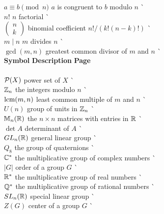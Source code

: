 \begin{tabbing}
$a \equiv b \pmod{n}$ \> $a$ is congruent to $b$ modulo $n$ \> 
     \` \pageref{amodb} \\
$n!$ \> $n$ factorial \> \` \pageref{factorial} \\
$\left(\begin{array}{c}n \\ k \end{array} \right)$ \> binomial
     coefficient $n!/(k! (n-k)!)$ \> \` \pageref{binomial} \\
$m \mid n$ \> $m$ divides $n$ \> \` \pageref{divides} \\
$\gcd(m, n)$ \> greatest common divisor of $m$ and $n$ \>
     \` \pageref{greatestcd} \\
{\bf Symbol}  \> {\bf Description} \>  \` {\bf Page} \\ 
     \mbox{\hspace*{1in}} \\
${\cal P}(X)$ \> power set of $X$ \> \` \pageref{powerset} \\
${\Bbb Z}_n$ \> the integers modulo $n$ \> \` \pageref{integersmodn} \\
$\operatorname{lcm}(m,n)$ \> least common multiple of $m$ and $n$ \>
     \` \pageref{leastcm} \\
$U(n)$ \> group of units in ${\Bbb Z}_n$ \> \` \pageref{groupofunits} \\
${\Bbb M}_n ( {\Bbb R})$ \> the $n \times n$ matrices with entries in
     ${\Bbb R}$ \> \`  \pageref{notematrices} \\
$\det A$ \> determinant of $A$ \> \` \pageref{determinant} \\
$GL_n({\Bbb R})$ \> general linear group \> \` \pageref{generallinear} \\
$Q_8$ \> the group of quaternions \> \` \pageref{notequateriongroup} \\
${\Bbb C}^\ast$ \> the multiplicative group of complex numbers \>
     \` \pageref{noteCstar} \\
$|G|$ \> order of a group $G$ \> \` \pageref{noteorder} \\
${\Bbb R}^*$ \> the multiplicative group of real numbers \>
     \` \pageref{noteRstar} \\
${\Bbb Q}^*$ \> the multiplicative group of rational numbers \>
     \` \pageref{noteQstar} \\
$SL_n({\Bbb R})$ \> special linear group \> \` \pageref{speciallinear} \\
$Z(G)$ \> center of a group $G$ \> \` \pageref{centerofagroup} \\

\end{tabbing}
